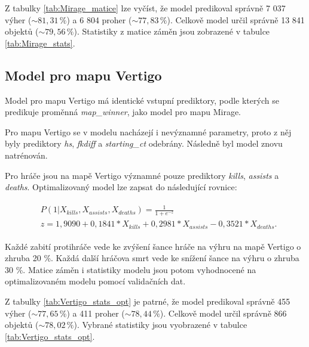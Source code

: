 



Z tabulky \ref{tab:Mirage_matice} lze vyčíst, že model predikoval správně 7 037 výher ($\sim 81,31 \,\% $) a 6 804 proher ($\sim 77,83 \,\% $).
Celkově model určil správně 13 841 objektů ($\sim 79,56 \,\% $). Statistiky z matice záměn jsou zobrazené v tabulce \ref{tab:Mirage_stats}.

\newpage
\subsection{Model pro mapu Vertigo}
Model pro mapu Vertigo má identické vstupní prediktory, podle kterých se predikuje proměnná \textit{map\_winner}, jako model pro mapu Mirage.



Pro mapu Vertigo se v modelu nacházejí i nevýznamné parametry, proto z něj byly prediktory \textit{hs}, \textit{fkdiff} a \textit{starting\_ct} odebrány.
Následně byl model znovu natrénován.



Pro hráče jsou na mapě Vertigo významné pouze prediktory \textit{kills}, \textit{assists} a \textit{deaths}.
Optimalizovaný model lze zapsat do následující rovnice:

\begin{align}
    \begin{split}
        &P(1 | X_{kills}, X_{assists}, X_{deaths}) = \frac{1}{1 + e^{-z}} \\
        &z = 1,9090 + 0,1841*X_{kills} + 0,2981*X_{assists} - 0,3521*X_{deaths}.
    \end{split}
\end{align}

Každé zabití protihráče vede ke zvýšení šance hráče na výhru na mapě Vertigo o zhruba 20 \%. Každá další hráčova smrt vede ke snížení šance na výhru o zhruba 30 \%. 
Matice záměn i statistiky modelu jsou potom vyhodnocené na optimalizovaném modelu pomocí validačních dat.





Z tabulky \ref{tab:Vertigo_stats_opt} je patrné, že model predikoval správně 455 výher ($\sim 77,65 \,\% $) a 411 proher ($\sim 78,44 \,\% $).
Celkově model určil správně 866 objektů ($\sim 78,02 \,\% $). Vybrané statistiky jsou vyobrazené v tabulce \ref{tab:Vertigo_stats_opt}.

